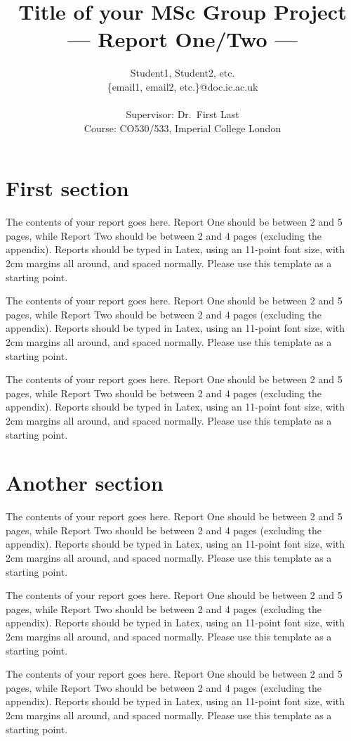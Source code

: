 \documentclass[a4paper,11pt]{article}
\title{Title of your MSc Group Project\\\Large{--- Report One/Two ---}}
\author{Student1, Student2, etc.\\
       \{email1, email2, etc.\}@doc.ic.ac.uk\\ \\
       \small{Supervisor: Dr.\ First Last}\\
       \small{Course: CO530/533, Imperial College London}
}
\begin{document}
\maketitle

\section{First section}

The contents of your report goes here.  Report One should be between 2
and 5 pages, while Report Two should be between 2 and 4 pages
(excluding the appendix).  Reports should be typed in Latex, using an
11-point font size, with 2cm margins all around, and spaced normally.
Please use this template as a starting point.

The contents of your report goes here.  Report One should be between 2
and 5 pages, while Report Two should be between 2 and 4 pages
(excluding the appendix).  Reports should be typed in Latex, using an
11-point font size, with 2cm margins all around, and spaced normally.
Please use this template as a starting point.

The contents of your report goes here.  Report One should be between 2
and 5 pages, while Report Two should be between 2 and 4 pages
(excluding the appendix).  Reports should be typed in Latex, using an
11-point font size, with 2cm margins all around, and spaced normally.
Please use this template as a starting point.


\section{Another section}

The contents of your report goes here.  Report One should be between 2
and 5 pages, while Report Two should be between 2 and 4 pages
(excluding the appendix).  Reports should be typed in Latex, using an
11-point font size, with 2cm margins all around, and spaced normally.
Please use this template as a starting point.

The contents of your report goes here.  Report One should be between 2
and 5 pages, while Report Two should be between 2 and 4 pages
(excluding the appendix).  Reports should be typed in Latex, using an
11-point font size, with 2cm margins all around, and spaced normally.
Please use this template as a starting point.

The contents of your report goes here.  Report One should be between 2
and 5 pages, while Report Two should be between 2 and 4 pages
(excluding the appendix).  Reports should be typed in Latex, using an
11-point font size, with 2cm margins all around, and spaced normally.
Please use this template as a starting point.
\end{document}
